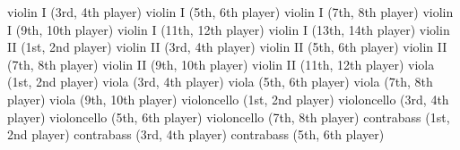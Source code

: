 {  violin I (3rd, 4th player) \newline
  violin I (5th, 6th player) \newline
  violin I (7th, 8th player) \newline
  violin I (9th, 10th player) \newline
  violin I (11th, 12th player) \newline
  violin I (13th, 14th player) \newline
  violin II (1st, 2nd player) \newline
  violin II (3rd, 4th player) \newline
  violin II (5th, 6th player) \newline
  violin II (7th, 8th player) \newline
  violin II (9th, 10th player) \newline
  violin II (11th, 12th player) \newline
  viola (1st, 2nd player) \newline
  viola (3rd, 4th player) \newline
  viola (5th, 6th player) \newline
  viola (7th, 8th player) \newline
  viola (9th, 10th player) \newline
  violoncello (1st, 2nd player) \newline
  violoncello (3rd, 4th player) \newline
  violoncello (5th, 6th player) \newline
  violoncello (7th, 8th player) \newline
  contrabass (1st, 2nd player) \newline
  contrabass (3rd, 4th player) \newline
  contrabass (5th, 6th player) \newline
  }
\newcommand{\commBy}{Kompositionsauftrag des Westdeutschen Rundfunks} %
\newcommand{\durAtion}{25 minutes} %
\newcommand{\dedicAtion}{für Akira und Michiko Ueda} %
